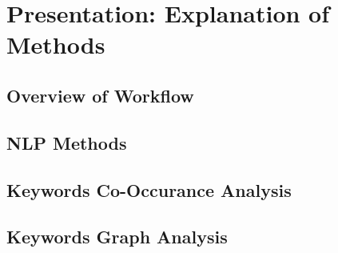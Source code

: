 \section{Presentation: Explanation of Methods}



\subsection{Overview of Workflow}




\subsection{NLP Methods}




\subsection{Keywords Co-Occurance Analysis}




\subsection{Keywords Graph Analysis}